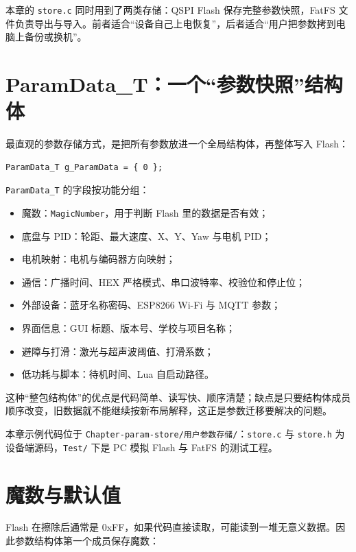 本章的 \texttt{store.c} 同时用到了两类存储：QSPI Flash 保存完整参数快照，FatFS 文件负责导出与导入。前者适合“设备自己上电恢复”，后者适合“用户把参数拷到电脑上备份或换机”。

\section{ParamData\_T：一个“参数快照”结构体}

最直观的参数存储方式，是把所有参数放进一个全局结构体，再整体写入 Flash：

\begin{lstlisting}[style=c]
ParamData_T g_ParamData = { 0 };
\end{lstlisting}

\texttt{ParamData\_T} 的字段按功能分组：

\begin{itemize}
\item 魔数：\texttt{MagicNumber}，用于判断 Flash 里的数据是否有效；
\item 底盘与 PID：轮距、最大速度、X、Y、Yaw 与电机 PID；
\item 电机映射：电机与编码器方向映射；
\item 通信：广播时间、HEX 严格模式、串口波特率、校验位和停止位；
\item 外部设备：蓝牙名称密码、ESP8266 Wi-Fi 与 MQTT 参数；
\item 界面信息：GUI 标题、版本号、学校与项目名称；
\item 避障与打滑：激光与超声波阈值、打滑系数；
\item 低功耗与脚本：待机时间、Lua 自启动路径。
\end{itemize}

这种“整包结构体”的优点是代码简单、读写快、顺序清楚；缺点是只要结构体成员顺序改变，旧数据就不能继续按新布局解释，这正是参数迁移要解决的问题。

本章示例代码位于 \texttt{Chapter-param-store/用户参数存储/}：\texttt{store.c} 与 \texttt{store.h} 为设备端源码，\texttt{Test/} 下是 PC 模拟 Flash 与 FatFS 的测试工程。

\section{魔数与默认值}

Flash 在擦除后通常是 0xFF，如果代码直接读取，可能读到一堆无意义数据。因此参数结构体第一个成员保存魔数：

